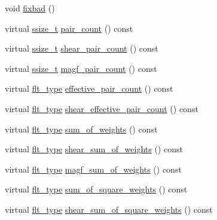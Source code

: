 \begin{DoxyCompactItemize}
\item 
void \hyperlink{classIceBRG_1_1pair__bin__summary_acdfe1a76073341dc7126367f8af9a92c}{fixbad} ()
\item 
virtual \hyperlink{lib_2IceBRG__main_2common_8h_ab322a3e50421dc5f0c43316b1b373592}{ssize\-\_\-t} \hyperlink{classIceBRG_1_1pair__bin__summary_a7890320b7873410727ffa9103cac4ddf}{pair\-\_\-count} () const 
\item 
virtual \hyperlink{lib_2IceBRG__main_2common_8h_ab322a3e50421dc5f0c43316b1b373592}{ssize\-\_\-t} \hyperlink{classIceBRG_1_1pair__bin__summary_a1907d19d230646152b52771046e9bca2}{shear\-\_\-pair\-\_\-count} () const 
\item 
virtual \hyperlink{lib_2IceBRG__main_2common_8h_ab322a3e50421dc5f0c43316b1b373592}{ssize\-\_\-t} \hyperlink{classIceBRG_1_1pair__bin__summary_aa411302e054c1ab2dc55f877efef03a9}{magf\-\_\-pair\-\_\-count} () const 
\item 
virtual \hyperlink{lib_2IceBRG__main_2common_8h_ad0f130a56eeb944d9ef2692ee881ecc4}{flt\-\_\-type} \hyperlink{classIceBRG_1_1pair__bin__summary_a66f311e593f9406545ccaf92c60af40d}{effective\-\_\-pair\-\_\-count} () const 
\item 
virtual \hyperlink{lib_2IceBRG__main_2common_8h_ad0f130a56eeb944d9ef2692ee881ecc4}{flt\-\_\-type} \hyperlink{classIceBRG_1_1pair__bin__summary_a63e24b9c233f7b9bc25417d7f4c3e31a}{shear\-\_\-effective\-\_\-pair\-\_\-count} () const 
\item 
virtual \hyperlink{lib_2IceBRG__main_2common_8h_ad0f130a56eeb944d9ef2692ee881ecc4}{flt\-\_\-type} \hyperlink{classIceBRG_1_1pair__bin__summary_ac7de7ef519ebec709aa75e49540060b8}{sum\-\_\-of\-\_\-weights} () const 
\item 
virtual \hyperlink{lib_2IceBRG__main_2common_8h_ad0f130a56eeb944d9ef2692ee881ecc4}{flt\-\_\-type} \hyperlink{classIceBRG_1_1pair__bin__summary_a9a891e623485e183eafdbb911e751b2b}{shear\-\_\-sum\-\_\-of\-\_\-weights} () const 
\item 
virtual \hyperlink{lib_2IceBRG__main_2common_8h_ad0f130a56eeb944d9ef2692ee881ecc4}{flt\-\_\-type} \hyperlink{classIceBRG_1_1pair__bin__summary_a9333a3ae54e73148957179aa2b18a3a7}{magf\-\_\-sum\-\_\-of\-\_\-weights} () const 
\item 
virtual \hyperlink{lib_2IceBRG__main_2common_8h_ad0f130a56eeb944d9ef2692ee881ecc4}{flt\-\_\-type} \hyperlink{classIceBRG_1_1pair__bin__summary_a423dac74001c5a426b4e626ca6615cb4}{sum\-\_\-of\-\_\-square\-\_\-weights} () const 
\item 
virtual \hyperlink{lib_2IceBRG__main_2common_8h_ad0f130a56eeb944d9ef2692ee881ecc4}{flt\-\_\-type} \hyperlink{classIceBRG_1_1pair__bin__summary_a63dd09417aa6bb32da1898e8baa0b306}{shear\-\_\-sum\-\_\-of\-\_\-square\-\_\-weights} () const 

\end{DoxyCompactItemize}
